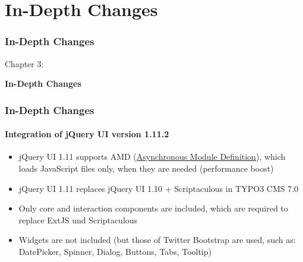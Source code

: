 %

\section{In-Depth Changes}
\begin{frame}[fragile]
	\frametitle{In-Depth Changes}

	\begin{center}\huge{Chapter 3:}\end{center}
	\begin{center}\huge{\color{typo3darkgrey}\textbf{In-Depth Changes}}\end{center}

\end{frame}


\begin{frame}[fragile]
	\frametitle{In-Depth Changes}
	\framesubtitle{Integration of jQuery UI version 1.11.2}

	\begin{itemize}
		\item jQuery UI 1.11 supports AMD
			(\href{http://en.wikipedia.org/wiki/Asynchronous_module_definition}{Asynchronous Module Definition}),
			which loads JavaScript files only, when they are needed (performance boost)

    	\item jQuery UI 1.11 replaces jQuery UI 1.10 + Scriptaculous in TYPO3 CMS 7.0

    	\item Only core and interaction components are included, which are required
    		to replace ExtJS und Scriptaculous

    	\item Widgets are not included (but those of Twitter Bootstrap are used,
    		such as: DatePicker, Spinner, Dialog, Buttons, Tabs, Tooltip)

	\end{itemize}

\end{frame}

